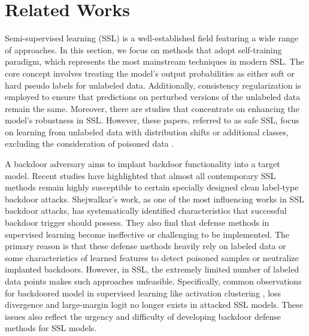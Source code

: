 \section{Related Works}
Semi-supervised learning (SSL) is a well-established field featuring a wide range of approaches\cite{mclachlan1975iterative}. In this section, we focus on methods that adopt self-training paradigm, which represents the most mainstream techniques in modern SSL\cite{scudder1965probability}. The core concept involves treating the model's output probabilities as either soft or hard pseudo labels for unlabeled data\cite{lee2013pseudo, berthelot2019remixmatch, zhai2019s4l}. Additionally, consistency regularization is employed to ensure that predictions on perturbed versions of the unlabeled data remain the same\cite{xie2020unsupervised, xu2021dash, wang2022freematch, chen2023softmatch}. Moreover, there are studies that concentrate on enhancing the model's robustness in SSL\cite{guo2022robust, jia2023bidirectional, li2023iomatch, wan2024unlocking}. However, these papers, referred to as safe SSL, focus on learning from unlabeled data with distribution shifts or additional classes, excluding the consideration of poisoned data \cite{li2019towards, guo2020safe}.

A backdoor adversary aims to implant backdoor functionality into a target model. Recent studies \cite{connor2022rethinking, turner2019label} have highlighted that almost all contemporary SSL methods remain highly susceptible to certain specially designed clean label-type backdoor attacks. Shejwalkar's work, as one of the most influencing works in SSL backdoor attacks, has systematically identified characteristics that successful backdoor trigger should possess\cite{shejwalkar2023perils}. They also find that defense methods in supervised learning \cite{shokri2020bypassing,liu2023beating} become ineffective or challenging to be implemented. The primary reason is that these defense methods heavily rely on labeled data or some characteristics of learned features to detect poisoned samples or neutralize implanted backdoors\cite{dong2021black, tejankar2023defending, wang2024mm}. However, in SSL, the extremely limited number of labeled data points makes such approaches unfeasible. Specifically, common observations for backdoored model in supervised learning like activation clustering \cite{chen2018detecting}, loss divergence \cite{li2021anti} and large-margin logit\cite{MM-BD} no longer exists in attacked SSL models. These issues also reflect the urgency and difficulty of developing backdoor defense methods for SSL models.